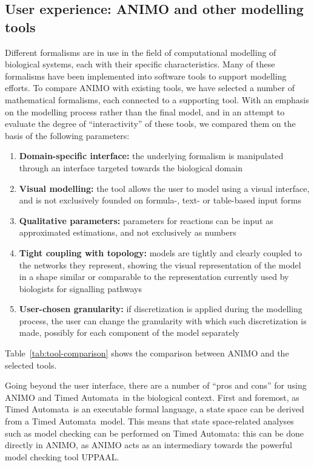 \documentclass{bmcart}
\def\tas{Timed Automata}
\begin{document}
\subsection*{User experience: ANIMO and other modelling tools}\label{suppl:comparison-table}
Different formalisms are in use in the field of computational
modelling of biological systems, each with their specific characteristics.
Many of these formalisms have been implemented into
software tools to support modelling efforts. To compare
ANIMO with existing tools, we have selected a number of mathematical formalisms,
each connected to a supporting tool. With an emphasis on the modelling
process rather than the final model, and in an attempt to
evaluate the degree of ``interactivity'' of these tools, we compared them on
the basis of the following parameters:

\begin{enumerate}
  \item {\bf Domain-specific interface:} the underlying formalism is manipulated through an interface
      targeted towards the biological domain
  \item {\bf Visual modelling:} the tool allows the user to model using a visual interface, and is not exclusively
      founded on formula-, text- or table-based input forms
  \item {\bf Qualitative parameters:} parameters for reactions can be input as approximated estimations, and not exclusively as numbers
  \item {\bf Tight coupling with topology:} models are tightly and clearly coupled to the networks they represent, showing the visual
      representation of the model in a shape similar or comparable to the representation currently used by biologists
      for signalling pathways
  \item {\bf User-chosen granularity:} if discretization is applied during the modelling process, the user can change the granularity
      with which such discretization is made, possibly for each component of the model separately
\end{enumerate}
Table~\ref{tab:tool-comparison} shows the comparison between ANIMO and the selected tools.





Going beyond the user interface, there are a number of ``pros and cons'' for using ANIMO and \tas\
in the biological context. First and foremost, as \tas\ is an executable formal language,
a state space can be derived from a \tas\ model. This means that state space-related analyses
such as model checking can be performed on \tas: this can
be done directly in ANIMO, as
ANIMO acts as an intermediary towards the powerful model checking tool UPPAAL.
\end{document}
